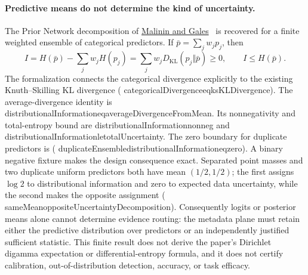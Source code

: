 \documentclass[11pt]{article}
\newcommand{\leanname}[1]{{\scriptsize\ttfamily
  \def\_{\textunderscore\allowbreak}#1}}
\begin{document}
\paragraph{Predictive means do not determine the kind of uncertainty.}
The Prior Network decomposition of
\href{https://arxiv.org/abs/1802.10501}{Malinin and
Gales}~\cite{malinin2018prior} is recovered for a finite weighted ensemble
of categorical predictors. If $\bar p=\sum_j w_jp_j$, then
\[
 I=H(\bar p)-\sum_jw_jH(p_j)
   =\sum_jw_jD_{\mathrm{KL}}(p_j\Vert\bar p)\geq0,
 \qquad I\leq H(\bar p).
\]
The formalization connects the categorical divergence explicitly to the
existing Knuth--Skilling KL divergence
(\leanname{categoricalDivergence\_eq\_ksKLDivergence}).
The average-divergence identity is
\leanname{distributionalInformation\_eq\_averageDivergenceFromMean}.
Its nonnegativity and total-entropy bound are
\leanname{distributionalInformation\_nonneg} and
\leanname{distributionalInformation\_le\_totalUncertainty}.
The zero boundary for duplicate predictors is
(\leanname{duplicateEnsemble\_distributionalInformation\_eq\_zero}).
A binary negative fixture makes the design consequence exact. Separated
point masses and two duplicate uniform predictors both have mean
$(1/2,1/2)$; the first assigns $\log 2$ to distributional information and
zero to expected data uncertainty, while the second makes the opposite
assignment
(\leanname{sameMean\_oppositeUncertaintyDecomposition}).
Consequently logits or posterior means alone cannot determine evidence
routing: the metadata plane must retain either the predictive distribution
over predictors or an independently justified sufficient statistic. This
finite result does not derive the paper's Dirichlet digamma expectation or
differential-entropy formula, and it does not certify calibration,
out-of-distribution detection, accuracy, or task efficacy.
\end{document}

